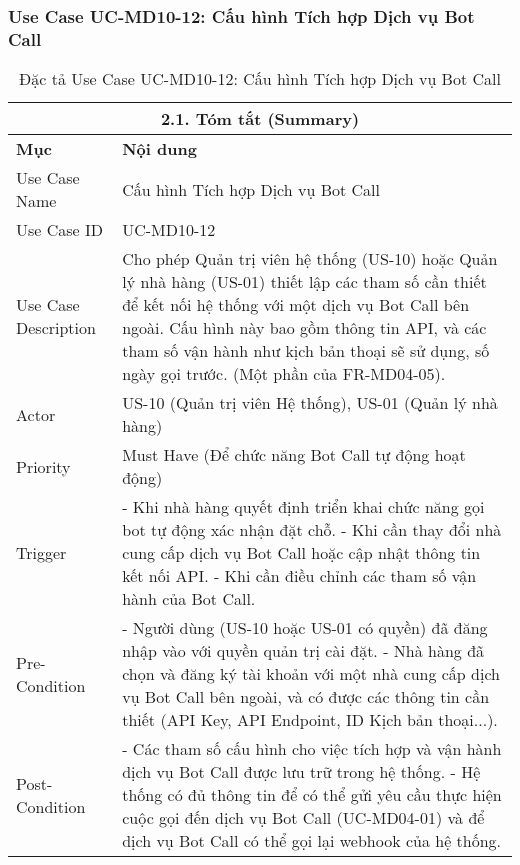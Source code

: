 \subsubsection{Use Case UC-MD10-12: Cấu hình Tích hợp Dịch vụ Bot Call}
\begin{longtable}{|m{4cm}|p{11cm}|}
\caption{Đặc tả Use Case UC-MD10-12: Cấu hình Tích hợp Dịch vụ Bot Call} \label{tab:uc_md10_12_full_v2_latex_fixed_in_codeblock} \\
\hline
\multicolumn{2}{|c|}{\textbf{2.1. Tóm tắt (Summary)}} \\
\hline
\textbf{Mục} & \textbf{Nội dung} \\
\hline
\endhead %
\midrule
\endfoot %
\bottomrule
\endlastfoot %
Use Case Name & Cấu hình Tích hợp Dịch vụ Bot Call \\
\hline
Use Case ID & UC-MD10-12 \\
\hline
Use Case Description & Cho phép Quản trị viên hệ thống (US-10) hoặc Quản lý nhà hàng (US-01) thiết lập các tham số cần thiết để kết nối hệ thống với một dịch vụ Bot Call bên ngoài. Cấu hình này bao gồm thông tin API, và các tham số vận hành như kịch bản thoại sẽ sử dụng, số ngày gọi trước. (Một phần của FR-MD04-05). \\
\hline
Actor & US-10 (Quản trị viên Hệ thống), US-01 (Quản lý nhà hàng) \\
\hline
Priority & Must Have (Để chức năng Bot Call tự động hoạt động) \\
\hline
Trigger & - Khi nhà hàng quyết định triển khai chức năng gọi bot tự động xác nhận đặt chỗ. \newline - Khi cần thay đổi nhà cung cấp dịch vụ Bot Call hoặc cập nhật thông tin kết nối API. \newline - Khi cần điều chỉnh các tham số vận hành của Bot Call. \\
\hline
Pre-Condition & - Người dùng (US-10 hoặc US-01 có quyền) đã đăng nhập vào với quyền quản trị cài đặt. \newline - Nhà hàng đã chọn và đăng ký tài khoản với một nhà cung cấp dịch vụ Bot Call bên ngoài, và có được các thông tin cần thiết (API Key, API Endpoint, ID Kịch bản thoại...). \\
\hline
Post-Condition & - Các tham số cấu hình cho việc tích hợp và vận hành dịch vụ Bot Call được lưu trữ trong hệ thống. \newline - Hệ thống có đủ thông tin để có thể gửi yêu cầu thực hiện cuộc gọi đến dịch vụ Bot Call (UC-MD04-01) và để dịch vụ Bot Call có thể gọi lại webhook của hệ thống. \\

\end{longtable}
